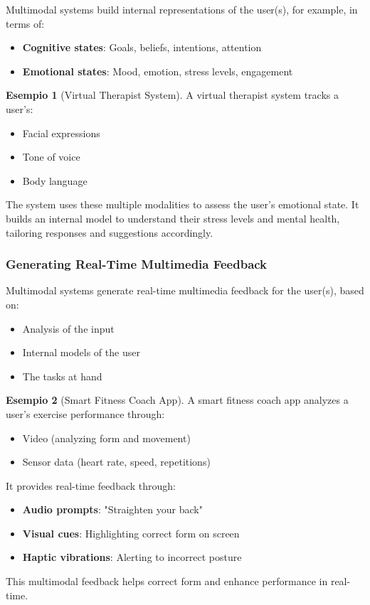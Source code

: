 \documentclass[11pt,a4paper]{article}
\theoremstyle{definition}
\newtheorem{example}{Esempio}[section]
\theoremstyle{plain}
\theoremstyle{remark}
\begin{document}
Multimodal systems build internal representations of the user(s), for example, in terms of:

\begin{itemize}
    \item \textbf{Cognitive states}: Goals, beliefs, intentions, attention
    \item \textbf{Emotional states}: Mood, emotion, stress levels, engagement
\end{itemize}

\begin{example}[Virtual Therapist System]
A virtual therapist system tracks a user's:
\begin{itemize}
    \item Facial expressions
    \item Tone of voice
    \item Body language
\end{itemize}

The system uses these multiple modalities to assess the user's emotional state. It builds an internal model to understand their stress levels and mental health, tailoring responses and suggestions accordingly.
\end{example}

\subsubsection{Generating Real-Time Multimedia Feedback}

Multimodal systems generate real-time multimedia feedback for the user(s), based on:

\begin{itemize}
    \item Analysis of the input
    \item Internal models of the user
    \item The tasks at hand
\end{itemize}

\begin{example}[Smart Fitness Coach App]
A smart fitness coach app analyzes a user's exercise performance through:
\begin{itemize}
    \item Video (analyzing form and movement)
    \item Sensor data (heart rate, speed, repetitions)
\end{itemize}

It provides real-time feedback through:
\begin{itemize}
    \item \textbf{Audio prompts}: "Straighten your back"
    \item \textbf{Visual cues}: Highlighting correct form on screen
    \item \textbf{Haptic vibrations}: Alerting to incorrect posture
\end{itemize}

This multimodal feedback helps correct form and enhance performance in real-time.
\end{example}
\end{document}
